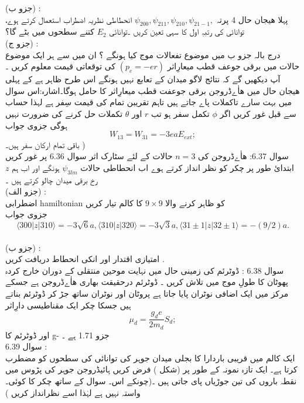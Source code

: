 (جزو ب) :\\  
پہلا هیجان حال
4
پرتہ
\(\psi_{200},\psi_{211},\psi_{210},\psi_{21-1},\)
انحطاطی نظریہ اضطراب استعمال کرتے ہوے، توانائی کی رتبہِ اول کا سہی تعین کریں ۔توانائی 
\(E_{2}\)
کتنے سطحوں میں بٹے گا؟\\
(جزو ج) :\\
 درج بالہ جزو ب میں موضوع تفعالات موج کیا ہونگے ؟ ان میں سے ہر ایک موضوع حالات میں برقی جوعف قطب میعارِاثر
\((p_{e}=-er)\)
کی توقعاتی قیمت معلوم کریں ۔ آپ دیکھیں گے کہ نتائج  لاگو میدان کے تعابع نہیں ہونگے اس طرح ظاہر ہے کے پہلی هیجان حال میں ھاٰےڈروجن برقی جوعفت قطب میعارِاثر کا حامل ہوگا۔اشارہ:اس سوال میں بہت سارے تاكملات پاے جاتے ہیں تاہم تقریبن تمام کی قیمت سِفر ہے لہذا حساب سے قبل غور کریں اگر 
\(\phi\)
تكمل سفر ہو تب 
\(r\)
اور 
\(\theta\)
تکملات حل کرنے  کی ضرورت نہیں ہوگی جزوی جواب
\[W_{13}=W_{31}=-3eaE_{ext};\]
باقی تمام ارکان سفر ہیں۔ )\\
سوال 6.37:
 ھاٰےڈروجن کی 
\(n=3\)
حالات کے لئے سٹارک  اثر سوال 6.36 پر غور کریں ابتدائ طور پر چکر کو نظر انداز کرتے ہوے اب انحطاطی حالات 
\(\psi_{3lm}\)
ہونگے اور اب ہم 
\(z\)
رخ برقی میدان چالو کرتے ہیں ۔\\
(جزو الف) :\\ 
اضطرابی hamiltonian کو ظاہر کرنے والا 
\(9\times9\)
کا کالم  تیار کریں\\
 جزوی جواب 
\[\langle 300|z|310\rangle =-3\sqrt{6}a,\langle 310|z|320\rangle =-3\sqrt{3}a,\langle 31\pm1|z|32\pm1\rangle=-(9/2)a.\]\\
(جزو ب) :\\ 
امتیازی اقتدار اور انکی انحطاط دریافت کریں .\\
سوال 6.38 :
  ڈوٹرئم
کی زمینی حال میں نہایت موحین منتقلی کے دوران خارج کردہ پھوٹان کا طولِ موج
میں تلاش کریں ۔ ڈوٹرئم درحقیقت بھاری ھاٰےڈروجن ہے جسکے مرکز میں ایک اضافی نوٹران پایا جاتا ہے پروٹان اور نوٹران ساتھ جڑ کر  ڈوٹرئم بناتے ہیں جسکا چکر ایک مقناطیسی دارِاثر
\[\mu_{d}=\frac{g_{d}e}{2m_{d}}S_{d};\]
اور ڈوٹرئم کا 
g-
جزو 1.71 ہے ۔\\
سوال 6.39 :\\
 ایک کالم میں قریبی باردارا کا بجلی میدان جوہر کی توانائی کی سطحوں کو مضطرب کرتا ہے۔ ایک تازہ نمونہ کے طور پر   (شکل )   فرض کریں  ہائیڈروجن  جوہر کی پڑوس میں نقطہ باروں کی تین جوڑیاں پای جاتی ہیں ۔(چونکے اس۔ سوال کے ساتھ چکر کا کوئی۔ واستہ نہیں ہے لہٰذا اسے نظرانداز کریں )
 
